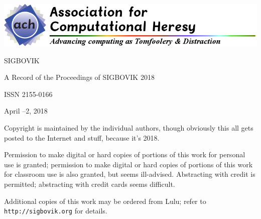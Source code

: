 \documentclass[12pt]{article}
\begin{document}
\newcommand\thisyear{2018}

\includegraphics[width=\textwidth]{copyright-header.png}\\
\vspace{10em}

SIGBOVIK

A Record of the Proceedings of SIGBOVIK \thisyear

ISSN 2155-0166

April --2, \thisyear

\vspace{2em}

Copyright is maintained by the individual authors, though obviously this all gets posted to the Internet and stuff, because it's \thisyear.

Permission to make digital or hard copies of portions of this work for personal use is granted; permission to make digital or hard copies of portions of this work for classroom use is also granted, but seems ill-advised.
Abstracting with credit is permitted; abstracting with credit cards seems difficult.

Additional copies of this work may be ordered from Lulu; refer to {\tt http://sigbovik.org} for details.

\thispagestyle{empty}
\end{document}
